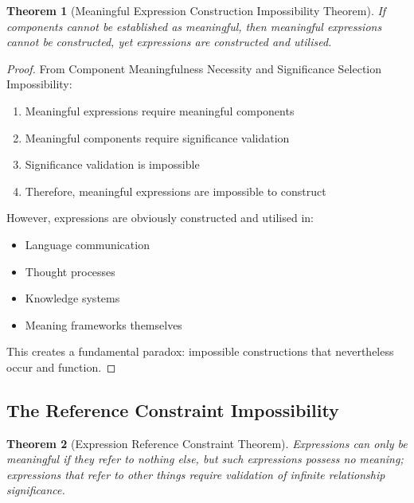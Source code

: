 \documentclass[12pt,a4paper]{article}
\newtheorem{theorem}{Theorem}[section]
\begin{document}
\begin{theorem}[Meaningful Expression Construction Impossibility Theorem]
If components cannot be established as meaningful, then meaningful expressions cannot be constructed, yet expressions are constructed and utilised.
\end{theorem}

\begin{proof}
From Component Meaningfulness Necessity and Significance Selection Impossibility:
\begin{enumerate}
\item Meaningful expressions require meaningful components
\item Meaningful components require significance validation  
\item Significance validation is impossible
\item Therefore, meaningful expressions are impossible to construct
\end{enumerate}

However, expressions are obviously constructed and utilised in:
\begin{itemize}
\item Language communication
\item Thought processes  
\item Knowledge systems
\item Meaning frameworks themselves
\end{itemize}

This creates a fundamental paradox: impossible constructions that nevertheless occur and function.
\end{proof}

\subsection{The Reference Constraint Impossibility}

\begin{theorem}[Expression Reference Constraint Theorem]
Expressions can only be meaningful if they refer to nothing else, but such expressions possess no meaning; expressions that refer to other things require validation of infinite relationship significance.
\end{theorem}
\end{document}
